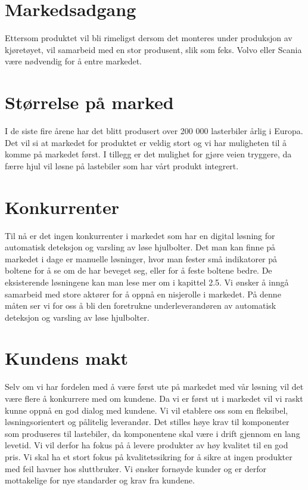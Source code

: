 \section{Markedsadgang}
Ettersom produktet vil bli rimeligst dersom det monteres under produksjon av kjøretøyet, vil  samarbeid med en stor produsent, slik som feks. Volvo eller Scania være nødvendig for å entre markedet. 
\section{Størrelse på marked}
I de siste fire årene har det blitt produsert over 200 000 lasterbiler årlig i Europa\cite{lastebilprod-DAF}. Det vil si at markedet for produktet er veldig stort og vi har muligheten til å komme på markedet først. I tillegg er det mulighet for gjøre veien tryggere, da færre hjul vil løsne på lastebiler som har vårt produkt integrert.
\section{Konkurrenter}
Til nå er det ingen konkurrenter i markedet som har en digital løsning for automatisk deteksjon og varsling av løse hjulbolter. Det man kan finne på markedet i dage er manuelle løsninger, hvor man fester små indikatorer på boltene for å se om de har beveget seg, eller for å feste boltene bedre. De eksisterende løsningene kan man lese mer om i kapittel 2.5.
Vi ønsker å inngå samarbeid med store aktører for å oppnå en nisjerolle i markedet. På denne måten ser vi for oss å bli den foretrukne underleverandøren av automatisk deteksjon og varsling av løse hjulbolter.
\section{Kundens makt}
Selv om vi har fordelen med å være først ute på markedet med vår løsning vil det være flere å konkurrere med om kundene. Da vi er først ut i markedet vil vi raskt kunne oppnå en god dialog med kundene. Vi vil etablere oss som en fleksibel, løsningsorientert og pålitelig leverandør. Det stilles høye krav til komponenter som produseres til lastebiler, da komponentene skal være i drift gjennom en lang levetid. Vi vil derfor ha fokus på å levere produkter av høy kvalitet til en god pris. Vi skal ha et stort fokus på kvalitetssikring for å sikre at ingen produkter med feil havner hos sluttbruker. Vi ønsker fornøyde kunder og er derfor mottakelige for nye standarder og krav fra kundene. 
